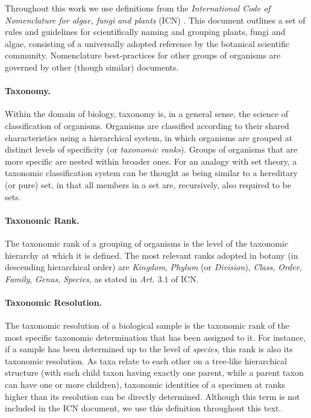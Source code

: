 Throughout this work we use definitions from the \textit{International Code of Nomenclature for algae, fungi and plants} (ICN) \cite{McNeill2012}. This document outlines a set of rules and guidelines for scientifically naming and grouping plants, fungi and algae, consisting of a universally adopted reference by the botanical scientific community. Nomenclature best-practices for other groups of organisms are governed by other (though similar) documents.

\paragraph*{Taxonomy.}
Within the domain of biology, taxonomy is, in a general sense, the science of classification of organisms. 
Organisms are classified according to their shared characteristics using a hierarchical system, in which organisms are grouped at distinct levels of specificity (or \textit{taxonomic ranks}).
Groups of organisms that are more specific are nested within broader ones. 
For an analogy with set theory, a taxonomic classification system can be thought as being similar to a hereditary (or pure) set, in that all members in a set are, recursively, also required to be sets.

\paragraph*{Taxonomic Rank.}
The taxonomic rank of a grouping of organisms is the level of the taxonomic hierarchy at which it is defined. The most relevant ranks adopted in botany (in descending hierarchical order) are \textit{Kingdom}, \textit{Phylum} (or \textit{Division}), \textit{Class}, \textit{Order}, \textit{Family}, \textit{Genus}, \textit{Species}, as stated in \textit{Art. $3.1$} of ICN.

\paragraph*{Taxonomic Resolution.}
The taxonomic resolution of a biological sample is the taxonomic rank of the most specific taxonomic determination that has been assigned to it.
For instance, if a sample has been determined up to the level of \textit{species}, this rank is also its taxonomic resolution.
As taxa relate to each other on a tree-like hierarchical structure (with each child taxon having exactly one parent, while a parent taxon can have one or more children), taxonomic identities of a specimen at ranks higher than its resolution can be directly determined.
Although this term is not included in the ICN document, we use this definition throughout this text.

